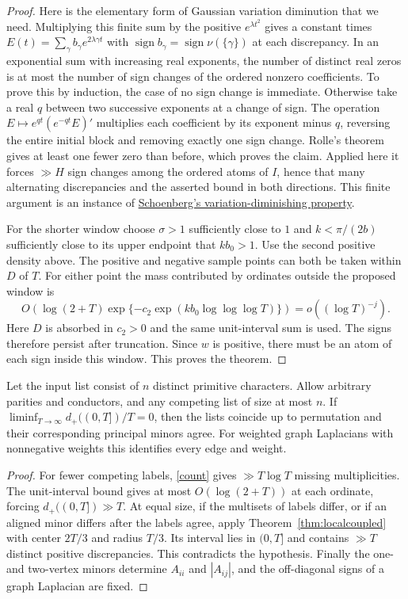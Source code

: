 \begin{proof}
Here is the elementary form of Gaussian variation diminution that we need.
Multiplying this finite sum by the positive $e^{\lambda t^2}$ gives a
constant times $E(t)=\sum_\gamma b_\gamma e^{2\lambda\gamma t}$ with
$\operatorname{sign} b_\gamma=\operatorname{sign}\nu(\{\gamma\})$ at
each discrepancy. In an exponential sum with increasing real exponents,
the number of distinct real zeros is at most the number of sign changes of
the ordered nonzero coefficients. To prove this by induction, the case of
no sign change is immediate. Otherwise take a real $q$ between two
successive exponents at a change of sign. The operation
$E\mapsto e^{qt}(e^{-qt}E)'$ multiplies each coefficient by its exponent
minus $q$, reversing the entire initial block and removing exactly one
sign change. Rolle's theorem gives at least one fewer zero than before,
which proves the claim. Applied here it forces $\gg H$ sign changes among
the ordered atoms of $I$, hence that many alternating discrepancies and
the asserted bound in both directions. This finite argument is an
instance of \href{https://doi.org/10.1073/pnas.34.4.164}{Schoenberg's
variation-diminishing property}.

For the shorter window choose $\sigma>1$ sufficiently close to $1$ and
$k<\pi/(2b)$ sufficiently close to its upper endpoint that $kb_0>1$.
Use the second positive density above. The positive and negative sample
points can both be taken within $D$ of $T$. For either point the mass
contributed by ordinates outside the proposed window is
\[
 O\left(\log(2+T)\exp\{-c_2\exp(k b_0\log\log\log T)\}\right)
       =o((\log T)^{-j}).
\]
Here $D$ is absorbed in $c_2>0$ and the same unit-interval sum is used.
The signs therefore persist after truncation. Since $w$ is positive, there
must be an atom of each sign inside this window. This proves the theorem.
\end{proof}

\begin{corollary}\label{cor:blindall}
Let the input list consist of $n$ distinct primitive characters.
Allow arbitrary parities and conductors, and any competing list of size at most
$n$. If
$\liminf_{T\to\infty}d_+((0,T])/T=0$, then the lists coincide up to
permutation and their corresponding principal minors agree. For weighted
graph Laplacians with nonnegative weights this identifies every edge and weight.
\end{corollary}
\begin{proof}
For fewer competing labels, \eqref{count} gives $\gg T\log T$ missing multiplicities. The unit-interval bound gives at most $O(\log(2+T))$ at each ordinate, forcing $d_+((0,T])\gg T$. At equal size, if the multisets of labels differ, or if an aligned minor differs after the labels agree, apply Theorem~\ref{thm:localcoupled} with center
$2T/3$ and radius $T/3$. Its interval lies in $(0,T]$ and contains
$\gg T$ distinct positive discrepancies. This contradicts the hypothesis.
Finally the one- and two-vertex minors determine $A_{ii}$ and $|A_{ij}|$,
and the off-diagonal signs of a graph Laplacian are fixed.
\end{proof}

